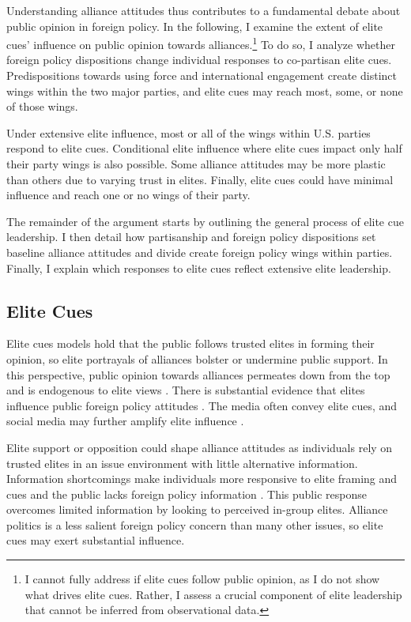 \documentclass[12pt]{article}
\begin{document}
Understanding alliance attitudes thus contributes to a fundamental debate about public opinion in foreign policy. 
In the following, I examine the extent of elite cues' influence on public opinion towards alliances.\footnote{I cannot fully address if elite cues follow public opinion, as I do not show what drives elite cues. Rather, I assess a crucial component of elite leadership that cannot be inferred from observational data.}
To do so, I analyze whether foreign policy dispositions change individual responses to co-partisan elite cues.
Predispositions towards using force and international engagement create distinct wings within the two major parties, and elite cues may reach most, some, or none of those wings.


Under extensive elite influence, most or all of the wings within U.S. parties respond to elite cues. 
Conditional elite influence where elite cues impact only half their party wings is also possible. 
Some alliance attitudes may be more plastic than others due to varying trust in elites. 
Finally, elite cues could have minimal influence and reach one or no wings of their party.


The remainder of the argument starts by outlining the general process of elite cue leadership.
I then detail how partisanship and foreign policy dispositions set baseline alliance attitudes and divide create foreign policy wings within parties.
Finally, I explain which responses to elite cues reflect extensive elite leadership. 


\subsection{Elite Cues} 


Elite cues models hold that the public follows trusted elites in forming their opinion, so elite portrayals of alliances bolster or undermine public support.
In this perspective, public opinion towards alliances permeates down from the top and is endogenous to elite views \citep{Druckman2014}.
There is substantial evidence that elites influence public foreign policy attitudes \citep{BaumPotter2008}. 
The media often convey elite cues, and social media may further amplify elite influence \citep{BaumPotter2019}.   


Elite support or opposition could shape alliance attitudes as individuals rely on trusted elites in an issue environment with little alternative information. 
Information shortcomings make individuals more responsive to elite framing and cues \citep{Druckman2001, Peterson2017} and the public lacks foreign policy information \citep{BaumPotter2008}.
This public response overcomes limited information by looking to perceived in-group elites. 
Alliance politics is a less salient foreign policy concern than many other issues, so elite cues may exert substantial influence.
\end{document}
